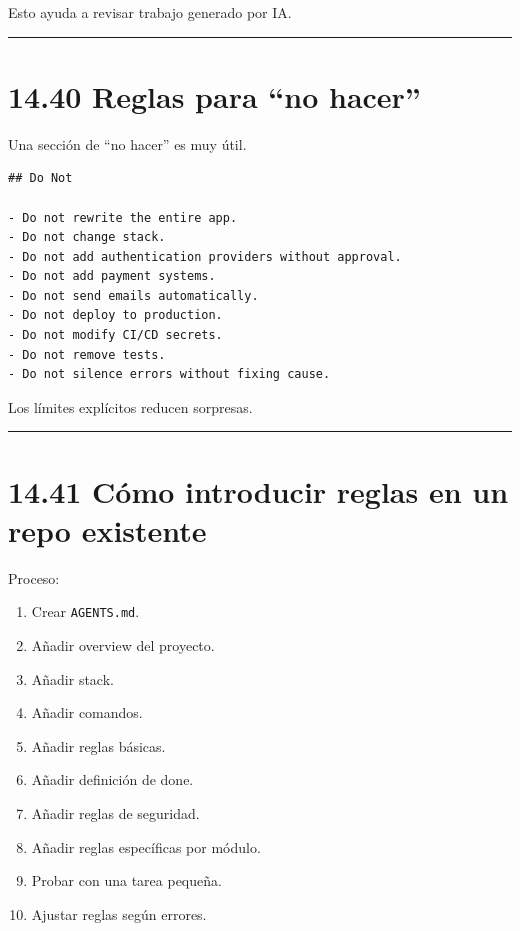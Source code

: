 Esto ayuda a revisar trabajo generado por IA.

\begin{center}\rule{0.5\linewidth}{0.5pt}\end{center}

\section{14.40 Reglas para ``no hacer''}\label{reglas-para-no-hacer}

Una sección de ``no hacer'' es muy útil.

\begin{lstlisting}
## Do Not

- Do not rewrite the entire app.
- Do not change stack.
- Do not add authentication providers without approval.
- Do not add payment systems.
- Do not send emails automatically.
- Do not deploy to production.
- Do not modify CI/CD secrets.
- Do not remove tests.
- Do not silence errors without fixing cause.
\end{lstlisting}

Los límites explícitos reducen sorpresas.

\begin{center}\rule{0.5\linewidth}{0.5pt}\end{center}

\section{14.41 Cómo introducir reglas en un repo
existente}\label{cuxf3mo-introducir-reglas-en-un-repo-existente}

Proceso:

\begin{enumerate}
\def\labelenumi{\arabic{enumi}.}
\tightlist
\item
  Crear \passthrough{\lstinline!AGENTS.md!}.
\item
  Añadir overview del proyecto.
\item
  Añadir stack.
\item
  Añadir comandos.
\item
  Añadir reglas básicas.
\item
  Añadir definición de done.
\item
  Añadir reglas de seguridad.
\item
  Añadir reglas específicas por módulo.
\item
  Probar con una tarea pequeña.
\item
  Ajustar reglas según errores.
\end{enumerate}

